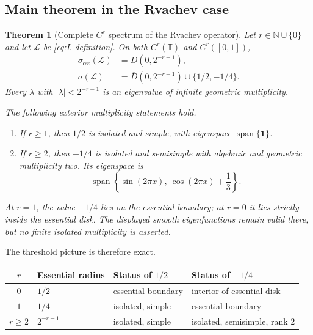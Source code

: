 \documentclass[11pt,a4paper]{article}
\newtheorem{theorem}{Theorem}[section]
\theoremstyle{definition}
\theoremstyle{remark}
\newcommand{\N}{\mathbb N}
\newcommand{\T}{\mathbb T}
\newcommand{\Dbar}[1]{\overline{D}(0,#1)}
\newcommand{\Span}{\operatorname{span}}
\newcommand{\spec}{\sigma}
\newcommand{\spece}{\sigma_{\mathrm{ess}}}
\newcommand{\Lop}{\mathcal L}
\newcommand{\one}{\mathbf 1}
\begin{document}
\subsection{Main theorem in the Rvachev case}
\begin{theorem}[Complete $C^r$ spectrum of the Rvachev operator]
\label{thm:main-rvachev}
Let $r\in\N\cup\{0\}$ and let $\Lop$ be \eqref{eq:L-definition}.
On both $C^r(\T)$ and $C^r([0,1])$,
\begin{align}
 \spece(\Lop)&=\Dbar{2^{-r-1}},
 \label{eq:main-essential}\\
 \spec(\Lop)&=\Dbar{2^{-r-1}}\cup\{1/2,-1/4\}.
 \label{eq:main-spectrum}
\end{align}
Every $\lambda$ with $|\lambda|<2^{-r-1}$ is an eigenvalue of infinite
geometric multiplicity.

The following exterior multiplicity statements hold.
\begin{enumerate}[label=\textup{(\alph*)}]
\item If $r\ge1$, then $1/2$ is isolated and simple, with eigenspace
      $\Span\{\one\}$.
\item If $r\ge2$, then $-1/4$ is isolated and semisimple with algebraic and
      geometric multiplicity two.  Its eigenspace is
      \begin{equation}
       \Span\left\{\sin(2\pi x),\ \cos(2\pi x)+\frac13\right\}.
       \label{eq:minus-quarter-space}
      \end{equation}
\end{enumerate}
At $r=1$, the value $-1/4$ lies on the essential boundary; at $r=0$ it lies
strictly inside the essential disk.  The displayed smooth eigenfunctions
remain valid there, but no finite isolated multiplicity is asserted.
\end{theorem}

The threshold picture is therefore exact.
\begin{center}
\small
\begin{tabularx}{0.92\textwidth}{@{}cL{0.18\textwidth}YY@{}}
\toprule
$r$ & Essential radius & Status of $1/2$ & Status of $-1/4$\\
\midrule
$0$ & $1/2$ & essential boundary & interior of essential disk\\
$1$ & $1/4$ & isolated, simple & essential boundary\\
$r\ge2$ & $2^{-r-1}$ & isolated, simple & isolated, semisimple, rank $2$\\
\bottomrule
\end{tabularx}
\end{center}
\end{document}
